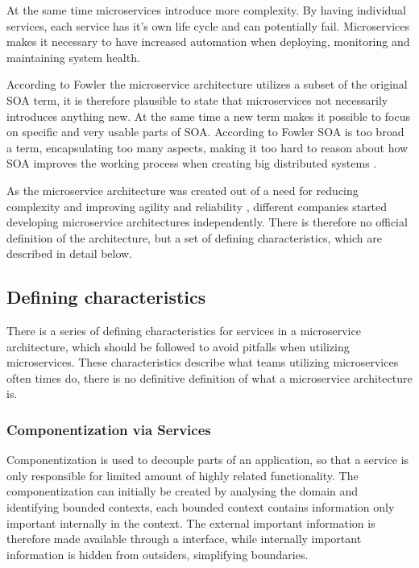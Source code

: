 At the same time microservices introduce more complexity. By having individual services, each service has it's own life cycle and can potentially fail. Microservices makes it necessary to have increased automation when deploying, monitoring and maintaining system health\cite{meshenberg2016microservices}.

According to Fowler the microservice architecture utilizes a subset of the original SOA term, it is therefore plausible to state that microservices not necessarily introduces anything new. At the same time a new term makes it possible to focus on specific and very usable parts of SOA. According to Fowler SOA is too broad a term, encapsulating too many aspects, making it too hard to reason about how SOA improves the working process when creating big distributed systems \cite[t.~13:22]{fowler2014microservicesoamonolith}.

As the microservice architecture was created out of a need for reducing complexity and improving agility and reliability \cite[p.~68]{long2017cloud} \cite[p.~192]{newman2015microservices}, different companies started developing microservice architectures independently. There is therefore no official definition of the architecture, but a set of defining characteristics, which are described in detail below.

\subsection{Defining characteristics}
There is a series of defining characteristics for services in a microservice architecture, which should be followed to avoid pitfalls when utilizing microservices. These characteristics describe what teams utilizing microservices often times do, there is no definitive definition of what a microservice architecture is.

\subsubsection*{Componentization via Services}
Componentization is used to decouple parts of an application, so that a service is only responsible for limited amount of highly related functionality\cite{morgantini2013whatAreMicroServices}. The componentization can initially be created by analysing the domain and identifying bounded contexts\cite[p.~31]{newman2015microservices}, each bounded context contains information only important internally in the context. 
The external important information is therefore made available through a interface, while internally important information is hidden from outsiders, simplifying boundaries.

